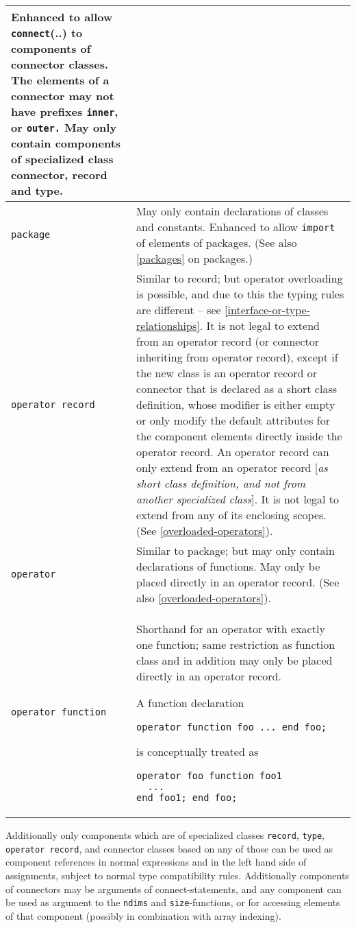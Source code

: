 \begin{longtable}{|p{4cm}|p{9cm}|}
Enhanced to allow \lstinline!connect!(..) to components of connector classes. The
elements of a connector may not have prefixes \lstinline!inner!, or \lstinline!outer.! May only
contain components of specialized class connector, record and
type.\\ \hline
\lstinline!package! & May only contain declarations of classes and
constants. Enhanced to allow \lstinline!import! of elements of packages. (See also
\autoref{packages} on packages.)\\ \hline
\lstinline!operator record! & Similar to record; but operator overloading
is possible, and due to this the typing rules are different -- see
\autoref{interface-or-type-relationships}. It is not legal to extend from an operator record (or
connector inheriting from operator record), except if the new class is
an operator record or connector that is declared as a short class
definition, whose modifier is either empty or only modify the default
attributes for the component elements directly inside the operator
record. An operator record can only extend from an operator record
{[}\emph{as short class definition, and not from another specialized
class}{]}. It is not legal to extend from any of its enclosing scopes.
(See \autoref{overloaded-operators}).\\ \hline
\lstinline!operator! & Similar to package; but may only contain
declarations of functions. May only be placed directly in an operator
record. (See also \autoref{overloaded-operators}).\\ \hline
\lstinline!operator function! & Shorthand for an
operator with exactly one function; same restriction as function class
and in addition may only be placed directly in an operator
record.
\begin{nonnormative}
A function declaration
\begin{lstlisting}[language=modelica]
operator function foo ... end foo;
\end{lstlisting}
is conceptually treated as
\begin{lstlisting}[language=modelica]
operator foo function foo1
  ...
end foo1; end foo;
\end{lstlisting}
\end{nonnormative}
\\ \hline
\end{longtable}
Additionally only components which are of specialized classes \lstinline!record!, \lstinline!type!, \lstinline!operator record!, and
connector classes based on any of those can be used as component references in normal expressions and in the left hand
side of assignments, subject to normal type compatibility rules.
Additionally components of connectors may be arguments of connect-statements,
and any component can be used as argument to the \lstinline!ndims! and \lstinline!size!-functions, or for accessing
elements of that component (possibly in combination with array indexing).

